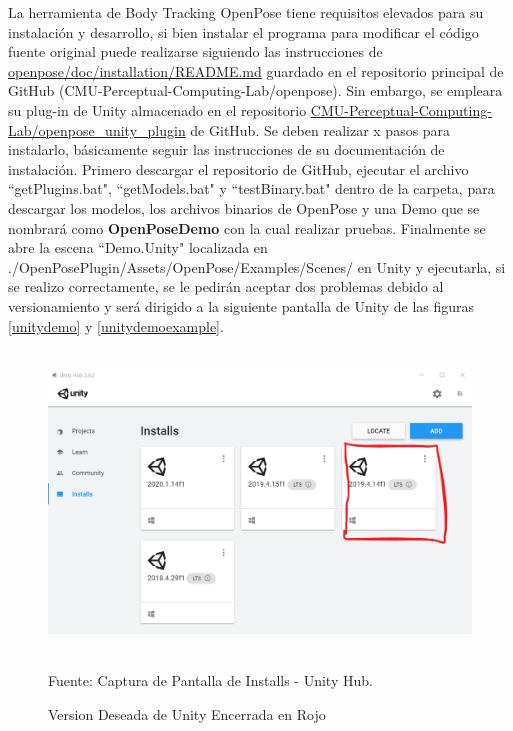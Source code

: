 La herramienta de Body Tracking OpenPose tiene requisitos elevados para su instalación y desarrollo, si bien instalar el programa para modificar el código fuente original puede realizarse siguiendo las instrucciones de  \href{https://github.com/CMU-Perceptual-Computing-Lab/openpose/blob/master/doc/installation/README.md}{openpose/doc/installation/README.md} guardado en el repositorio principal de GitHub (CMU-Perceptual-Computing-Lab/openpose). Sin embargo, se empleara su plug-in de Unity almacenado en el repositorio  \href{https://github.com/CMU-Perceptual-Computing-Lab/openpose\_unity\_plugin}{CMU-Perceptual-Computing-Lab/openpose\_unity\_plugin} de GitHub.
Se deben realizar x pasos para instalarlo, básicamente seguir las instrucciones de su documentación de instalación. Primero descargar el repositorio de GitHub, ejecutar el archivo ``getPlugins.bat", ``getModels.bat" y ``testBinary.bat" dentro de la carpeta, para descargar los modelos, los archivos binarios de OpenPose y una Demo que se nombrará como \textbf{OpenPoseDemo} con la cual realizar pruebas. 
Finalmente se abre la escena ``Demo.Unity" localizada en ./OpenPosePlugin/Assets/OpenPose/Examples/Scenes/ en Unity y ejecutarla, si se realizo correctamente, se le pedirán aceptar dos problemas debido al versionamiento y será dirigido a la siguiente pantalla de Unity de las figuras \ref{unitydemo} y \ref{unitydemoexample}.
\begin{figure}[t!]
	\centering
	\includegraphics[width=12cm,height=8cm,]{./Images/installunity.png}
	\caption{Version Deseada de Unity Encerrada en Rojo}
	\footnotesize Fuente: Captura de Pantalla de Installs - Unity Hub.
	\label{installunity}
\end{figure}
